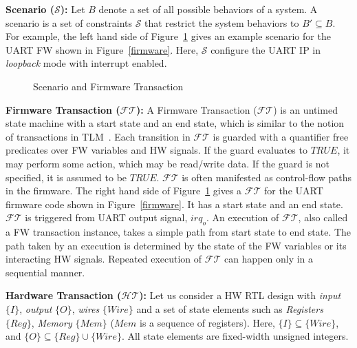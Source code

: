 \documentclass[sigconf]{acmart}
\newcommand{\Omit}[1]{}
\begin{document}
\textbf{Scenario ($\mathcal{S}$):}
Let $B$ denote a set of all possible behaviors of a system. A scenario is a set of 
constraints $\mathcal{S}$ that restrict the system behaviors
to $B' \subseteq B$. For example, the left hand side of Figure~\ref{fig:st} 
gives an example scenario for the UART FW shown in Figure~\ref{firmware}. 
Here, $\mathcal{S}$ configure the UART IP in {\em loopback} mode with 
interrupt enabled.

\Omit{ 
\textbf{Use case:}
A {\em Use case} is a set of scenarios that satisfy 
a particular goal. A use case completes successfully 
when that goal is satisfied. A complete set of use cases 
defines all the behaviors required of the system. For example, 
a use case in case of UART IP may be to transmit 
the data through the serial port. A scenario is an 
instance of a use case. 
}
%
\begin{figure}[t]
\caption{Scenario and Firmware Transaction
\label{fig:st}}
\end{figure}

\textbf{Firmware Transaction ($\mathcal{FT}$):} 
A Firmware Transaction ($\mathcal{FT}$) is an untimed state machine 
with a start state and an end state, which is similar to the notion of 
transactions in TLM~\cite{codes14}. 
Each transition in $\mathcal{FT}$ is guarded with a quantifier free predicates
over FW variables and HW signals.
If the guard evaluates to $TRUE$, it may perform some action, which may be 
read/write data. If the guard is not specified, it is assumed to be $TRUE$.
$\mathcal{FT}$ is often manifested as control-flow paths in the firmware. 
The right hand side of Figure~\ref{fig:st} gives a 
$\mathcal{FT}$ for the UART firmware code shown in Figure~\ref{firmware}. 
It has a start state and an end state. $\mathcal{FT}$ is triggered from 
UART output signal, $irq_o$. An execution of $\mathcal{FT}$, also called a 
FW transaction instance, takes a simple path from start state to end state. 
The path taken by an execution is determined by the state of 
the FW variables or its interacting HW signals. Repeated execution of 
$\mathcal{FT}$ can happen only in a sequential manner.  
 
\textbf{Hardware Transaction ($\mathcal{HT}$):} 
Let us consider a HW RTL design with \textit{input} $\{I\}$, 
\textit{output} $\{O\}$, \textit{wires} $\{Wire\}$ and a set of 
state elements such as \textit{Registers} $\{Reg\}$, \textit{Memory}
$\{Mem\}$ ($Mem$ is a sequence of registers). Here, 
$\{I\} \subseteq \{Wire\}$, and $\{O\} \subseteq \{Reg\} \cup \{Wire\}$.
All state elements are fixed-width unsigned integers. 
\end{document}
